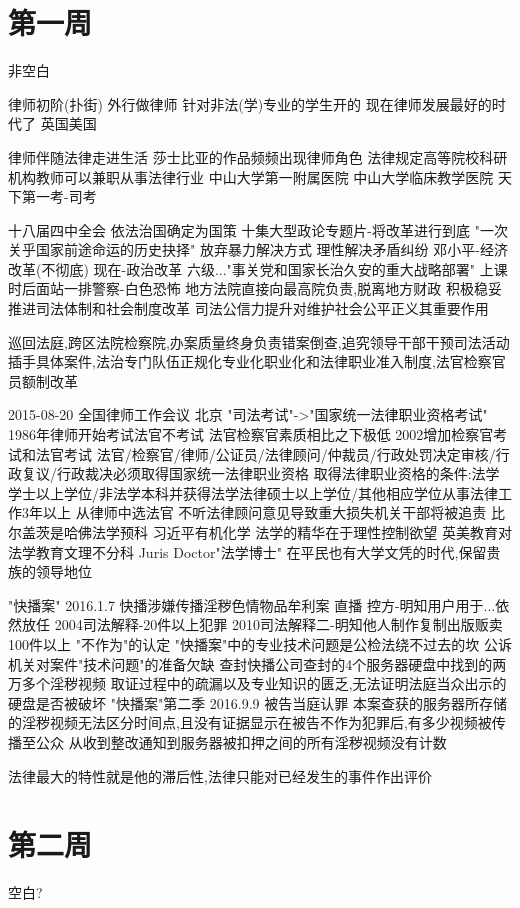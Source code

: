 \documentclass{article}
\begin{document}
\begin{CJK*}{UTF8}{gbsn}
\section{第一周} 非空白

律师初阶(扑街) 外行做律师 针对非法(学)专业的学生开的 现在律师发展最好的时代了 英国美国

律师伴随法律走进生活 莎士比亚的作品频频出现律师角色 法律规定高等院校科研机构教师可以兼职从事法律行业 中山大学第一附属医院 中山大学临床教学医院 天下第一考-司考

十八届四中全会 依法治国确定为国策 十集大型政论专题片-将改革进行到底 "一次关乎国家前途命运的历史抉择" 放弃暴力解决方式 理性解决矛盾纠纷 邓小平-经济改革(不彻底) 现在-政治改革 六级..."事关党和国家长治久安的重大战略部署" 上课时后面站一排警察-白色恐怖 地方法院直接向最高院负责,脱离地方财政 积极稳妥推进司法体制和社会制度改革 司法公信力提升对维护社会公平正义其重要作用

巡回法庭,跨区法院检察院,办案质量终身负责错案倒查,追究领导干部干预司法活动插手具体案件,法治专门队伍正规化专业化职业化和法律职业准入制度,法官检察官员额制改革

2015-08-20 全国律师工作会议 北京 "司法考试"->"国家统一法律职业资格考试" 1986年律师开始考试法官不考试 法官检察官素质相比之下极低 2002增加检察官考试和法官考试 法官/检察官/律师/公证员/法律顾问/仲裁员/行政处罚决定审核/行政复议/行政裁决必须取得国家统一法律职业资格 取得法律职业资格的条件:法学学士以上学位/非法学本科并获得法学法律硕士以上学位/其他相应学位从事法律工作3年以上 从律师中选法官 不听法律顾问意见导致重大损失机关干部将被追责 比尔盖茨是哈佛法学预科 习近平有机化学 法学的精华在于理性控制欲望 英美教育对法学教育文理不分科 Juris Doctor"法学博士" 在平民也有大学文凭的时代,保留贵族的领导地位

"快播案" 2016.1.7 快播涉嫌传播淫秽色情物品牟利案 直播 控方-明知用户用于...依然放任 2004司法解释-20件以上犯罪 2010司法解释二-明知他人制作复制出版贩卖100件以上 "不作为"的认定 "快播案"中的专业技术问题是公检法绕不过去的坎 公诉机关对案件"技术问题"的准备欠缺 查封快播公司查封的4个服务器硬盘中找到的两万多个淫秽视频 取证过程中的疏漏以及专业知识的匮乏,无法证明法庭当众出示的硬盘是否被破坏
"快播案"第二季 2016.9.9 被告当庭认罪
本案查获的服务器所存储的淫秽视频无法区分时间点,且没有证据显示在被告不作为犯罪后,有多少视频被传播至公众 从收到整改通知到服务器被扣押之间的所有淫秽视频没有计数

法律最大的特性就是他的滞后性,法律只能对已经发生的事件作出评价

\section{第二周} 空白?


\end{CJK*}
\end{document}
